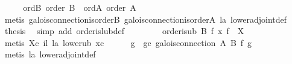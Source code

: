 \begin{isabellebody}
%
\isadelimproof
%
\endisadelimproof
%
\isatagproof
{}\isamarkupfalse%
\ {}\isanewline
\ \ \isamarkupfalse%
\ ord{}B{}\ {}order\ B{}\ \ ord{}A{}\ {}order\ A{}\isanewline
\ \ \ \ \isamarkupfalse%
\ {}metis\ galois{}connection{}is{}order{}B\ galois{}connection{}is{}order{}A\ la\ lower{}adjoint{}def{}{}\isanewline
\ \ \isamarkupfalse%
\ {}thesis\ \isamarkupfalse%
\ {}simp\ add{}\ order{}is{}lub{}def{}\isanewline
\ \ \isamarkupfalse%
\isanewline
\ \ \ \ \isamarkupfalse%
\ {}order{}is{}ub\ B\ {}f\ x{}\ {}f\ {}\ X{}{}\isanewline
\ \ \ \ \ \ \isamarkupfalse%
\ {}metis\ Xc\ il\ la\ lower{}ub\ xc{}\isanewline
\isanewline
\ \ \ \ \isamarkupfalse%
\ g\ \ gc{}\ {}galois{}connection\ A\ B\ f\ g{}\isanewline
\ \ \ \ \ \ \isamarkupfalse%
\ {}metis\ la\ lower{}adjoint{}def{}\isanewline

\end{isabellebody}
